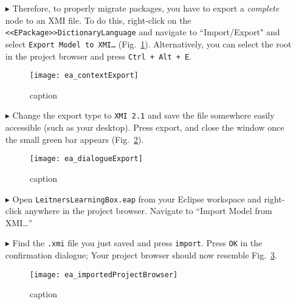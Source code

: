\begin{itemize}
\clearpage

\item[$\blacktriangleright$] Therefore, to properly migrate packages, you have to export a \emph{complete} node to an XMI file. To do this, right-click on the
\texttt{<<EPack\-age>>DictionaryLanguage} and navigate to ``Import/Export" and select \texttt{Export Model to XMI\ldots} (Fig.~\ref{fig:contextExport}).
Alternatively, you can select the root in the project browser and press \texttt{Ctrl + Alt + E}.

\vspace{0.5cm}

\begin{figure}[htbp]
\begin{center}
  \texttt{[image: ea\_contextExport]}
  \caption{caption}
  \label{fig:contextExport}
\end{center}
\end{figure}

\item[$\blacktriangleright$] Change the export type to \texttt{XMI 2.1} and save the file somewhere easily accessible (such as your desktop). Press export, and
close the window once the small green bar appears (Fig.~\ref{fig:export}).

\vspace{0.5cm}

\begin{figure}[htbp]
\begin{center}
  \texttt{[image: ea\_dialogueExport]}
  \caption{caption}
  \label{fig:export}
\end{center}
\end{figure}

\item[$\blacktriangleright$] Open \texttt{LeitnersLearningBox.eap} from your Eclipse workspace and right-click anywhere in the project browser. Navigate to
``Import Model from XMI\ldots''

\item[$\blacktriangleright$] Find the \texttt{.xmi} file you just saved and press \texttt{import}. Press \texttt{OK} in the confirmation dialogue; Your project
browser should now resemble Fig.~\ref{fig:importProBrowser}.

\begin{figure}[htbp]
\begin{center}
  \texttt{[image: ea\_importedProjectBrowser]}
  \caption{caption}
  \label{fig:importProBrowser}
\end{center}
\end{figure}


\end{itemize}
